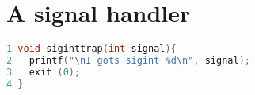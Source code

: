 \section{A signal handler}
\label{siginttrap}
\begin{lstlisting}[language=C]
1 void siginttrap(int signal){
2   printf("\nI gots sigint %d\n", signal);
3   exit (0);
4 }
\end{lstlisting}
